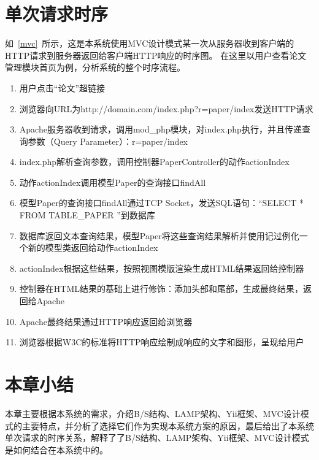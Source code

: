 \section{单次请求时序}
如~\ref{mvc}~所示，这是本系统使用MVC设计模式某一次从服务器收到客户端的HTTP请求到服务器返回给客户端HTTP响应的时序图。
在这里以用户查看论文管理模块首页为例，分析系统的整个时序流程。
\begin{enumerate}
\item 用户点击“论文”超链接
\item 浏览器向URL为http://domain.com/index.php?r=paper/index发送HTTP请求
\item Apache服务器收到请求，调用mod\_php模块，对index.php执行，并且传递查询参数（Query Parameter）：r=paper/index
\item index.php解析查询参数，调用控制器PaperController的动作actionIndex
\item 动作actionIndex调用模型Paper的查询接口findAll
\item 模型Paper的查询接口findAll通过TCP Socket，发送SQL语句：“SELECT * FROM TABLE\_PAPER ”到数据库
\item 数据库返回文本查询结果，模型Paper将这些查询结果解析并使用记过例化一个新的模型类返回给动作actionIndex
\item actionIndex根据这些结果，按照视图模版渲染生成HTML结果返回给控制器
\item 控制器在HTML结果的基础上进行修饰：添加头部和尾部，生成最终结果，返回给Apache
\item Apache最终结果通过HTTP响应返回给浏览器
\item 浏览器根据W3C的标准将HTTP响应绘制成响应的文字和图形，呈现给用户 
\end{enumerate}


\section{本章小结}
本章主要根据本系统的需求，介绍B/S结构、LAMP架构、Yii框架、MVC设计模式的主要特点，并分析了选择它们作为实现本系统方案的原因，最后给出了本系统单次请求的时序关系，解释了了B/S结构、LAMP架构、Yii框架、MVC设计模式是如何结合在本系统中的。
